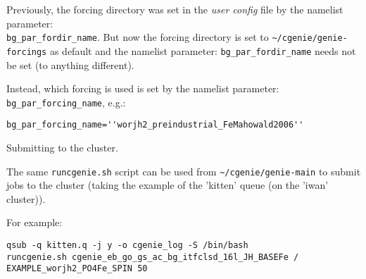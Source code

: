 \documentclass[10pt,twoside]{article}
\begin{document}
\begin{compactenum}
\item Previously, the forcing directory was set in the \textit{user config} file by the namelist parameter:
\\ \texttt{bg\_par\_fordir\_name}. But now the forcing directory is set to \texttt{\~{}/cgenie/genie-forcings} as default and the namelist parameter: \texttt{bg\_par\_fordir\_name} needs not be set (to anything different).

Instead, which forcing is used is set by the namelist parameter: \texttt{bg\_par\_forcing\_name}, e.g.:
\vspace{-5pt}\begin{verbatim}
bg_par_forcing_name=''worjh2_preindustrial_FeMahowald2006''
\end{verbatim}\vspace{-0pt}

\item  Submitting to the cluster.

The same \texttt{runcgenie.sh} script can be used from \texttt{\~{}/cgenie/genie-main} to submit jobs to the cluster (taking the example of the 'kitten' queue (on the 'iwan' cluster)).
        
For example:
\vspace{-5pt}\begin{verbatim}
qsub -q kitten.q -j y -o cgenie_log -S /bin/bash
runcgenie.sh cgenie_eb_go_gs_ac_bg_itfclsd_16l_JH_BASEFe / 
EXAMPLE_worjh2_PO4Fe_SPIN 50
\end{verbatim}\vspace{-5pt}
  
\end{compactenum}


\end{document}

